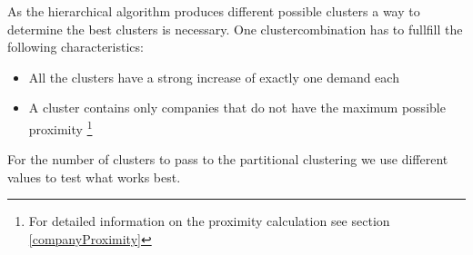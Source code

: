 As the hierarchical algorithm produces different possible clusters a way to determine the best clusters is necessary. One clustercombination
has to fullfill the following characteristics:
\begin{itemize}
  \item All the clusters have a strong increase of exactly one demand each
  \item A cluster contains only companies that do not have the maximum possible proximity \footnote{For detailed information on the proximity calculation see section \ref{companyProximity}}
\end{itemize}

For the number of clusters to pass to the partitional clustering we use different values to test what works best.
